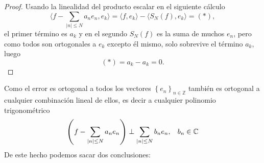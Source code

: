 \documentclass[12pt]{article}
\newcommand{\C}{\mathbb{C}}
\theoremstyle{plain}
\theoremstyle{definition}
\numberwithin{equation}{section}
\begin{document}
            \begin{proof}
                Usando la linealidad del producto escalar en el siguiente cálculo
                \begin{equation*}
                    \langle f - \sum_{\left\lvert n\right\rvert \leq N } a_n e_n, e_k \rangle = \langle f, e_k \rangle - \langle S_N (f), e_k \rangle = (\ast), 
                \end{equation*}
                el primer término es \(a_k\) y en el segundo \(S_N (f)\) es la suma de muchos \(e_n\), pero como todos son ortogonales a \(e_k\) excepto él mismo, solo sobrevive el término \(a_k\), luego
                \begin{equation*}
                    (\ast) = a_k - a_k =  0.
                \end{equation*}
            \end{proof}
            Como el error es ortogonal a todos los vectores \(\left\{e_n\right\}_{n \in \mathbb{Z}} \) también es ortogonal a cualquier combinación lineal de ellos, es decir a cualquier polinomio trigonométrico
            \begin{equation*}
                \left(f - \sum_{\left\lvert n\right\rvert \leq N } a_n e_n\right)  \perp \sum_{\left\lvert n\right\rvert \leq N } b_n e_n, \hspace{3mm} b_n \in \C
            \end{equation*}
            De este hecho podemos sacar dos conclusiones:
\end{document}
